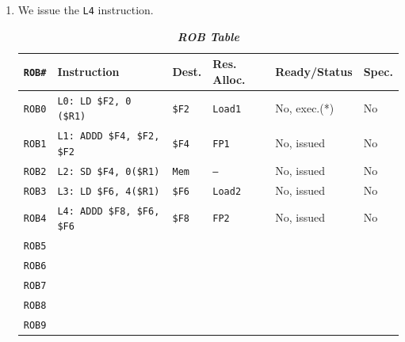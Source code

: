 \begin{enumerate}
    \item We issue the \texttt{L4} instruction.
    \begin{table}[!htp]
        \centering
        \begin{adjustbox}{width={\textwidth},totalheight={\textheight},keepaspectratio}
            \begin{tabular}{@{} l l l l l l @{}}
                \toprule
                \texttt{ROB\#}  & \textbf{Instruction} & \textbf{Dest.} & \textbf{Res. Alloc.} & \textbf{Ready/Status} & \textbf{Spec.} \\
                \midrule
                \texttt{ROB0}   & \texttt{L0: LD \$F2, 0 (\$R1)}    & \texttt{\$F2} & \texttt{Load1}    & No, exec.(*)  & No    \\ [.3em]
                \texttt{ROB1}   & \texttt{L1: ADDD \$F4, \$F2, \$F2}& \texttt{\$F4} & \texttt{FP1}      & No, issued    & No    \\ [.3em]
                \texttt{ROB2}   & \texttt{L2: SD \$F4, 0(\$R1)}     & \texttt{Mem}  & \texttt{--}       & No, issued    & No    \\ [.3em]
                \texttt{ROB3}   & \texttt{L3: LD \$F6, 4(\$R1)}     & \texttt{\$F6} & \texttt{Load2}    & No, issued    & No    \\ [.3em]
                \texttt{ROB4}   & \texttt{L4: ADDD \$F8, \$F6, \$F6}& \texttt{\$F8} & \texttt{FP2}      & No, issued    & No    \\ [.3em]
                \texttt{ROB5}   &                                   &               &                   &               &       \\ [.3em]
                \texttt{ROB6}   &                                   &               &                   &               &       \\ [.3em]
                \texttt{ROB7}   &                                   &               &                   &               &       \\ [.3em]
                \texttt{ROB8}   &                                   &               &                   &               &       \\ [.3em]
                \texttt{ROB9}   &                                   &               &                   &               &       \\
                \bottomrule
            \end{tabular}
        \end{adjustbox}
        \caption*{\emph{\textbf{ROB Table}}}
    \end{table}

\end{enumerate}
